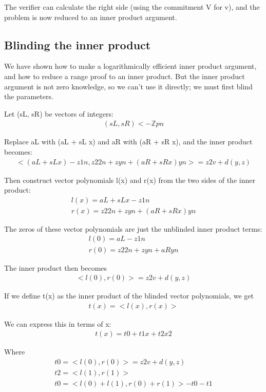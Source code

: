 \documentclass{article}
\begin{document}
The verifier can calculate the right side (using the commitment V for v), and the problem is now reduced to an inner product argument.


\subsection{Blinding the inner product}

We have shown how to make a logarithmically efficient inner product argument, and how to reduce a range proof to an inner product.  But the inner product argument is not zero knowledge, so we can't use it directly; we must first blind the parameters.

Let (sL, sR) be vectors of integers:
\begin{eqnarray}
  (sL, sR) <- \mathbb{Z}pn
\end{eqnarray}

Replace aL with (aL + sL x) and aR with (aR + sR x), and the inner product becomes:
\begin{eqnarray}
  <(aL + sL x) - z 1n, z2 2n + z yn + (aR+ sR x)yn> = z2 v + d(y,z)
\end{eqnarray}

Then construct vector polynomials l(x) and r(x) from the two sides of the inner product:
\begin{eqnarray}
  l(x) = aL + sL x - z 1n\\
  r(x) = z2 2n + z yn + (aR+ sR x)yn
\end{eqnarray}

The zeros of these vector polynomials are just the unblinded inner product terms:
\begin{eqnarray}
  l(0) = aL - z 1n\\
  r(0) = z2 2n + z yn + aRyn
\end{eqnarray}

The inner product then becomes
\begin{eqnarray}
  <l(0), r(0)> = z2 v + d(y,z)
\end{eqnarray}

If we define t(x) as the inner product of the blinded vector polynomials, we get
\begin{eqnarray}
  t(x) = <l(x), r(x)> 
\end{eqnarray}

We can express this in terms of x:
\begin{eqnarray}
  t(x) = t0 + t1 x + t2 x2
\end{eqnarray}

Where
\begin{eqnarray}
  t0 = <l(0), r(0)> = z2 v + d(y,z)\\
  t2 = <l(1), r(1)>\\
  t0 = <l(0) + l(1), r(0) + r(1)> - t0 - t1
\end{eqnarray}
\end{document}
